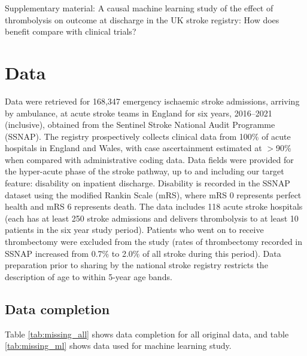 
{\huge Supplementary material: A causal machine learning study of the effect of thrombolysis on outcome at discharge in the UK stroke registry: How does benefit compare with clinical trials?}


\section{Data}



Data were retrieved for 168,347 emergency ischaemic stroke admissions, arriving by ambulance, at acute stroke teams in England for six years, 2016–2021 (inclusive), obtained from the Sentinel Stroke National Audit Programme (SSNAP). The registry prospectively collects clinical data from 100\% of acute hospitals in England and Wales, with case ascertainment estimated at $>$90\% when compared with administrative coding data. Data fields were provided for the hyper-acute phase of the stroke pathway, up to and including our target feature: disability on inpatient discharge. Disability is recorded in the SSNAP dataset using the modified Rankin Scale (mRS), where mRS 0 represents perfect health and mRS 6 represents death. The data includes 118 acute stroke hospitals (each has at least 250 stroke admissions and delivers thrombolysis to at least 10 patients in the six year study period). Patients who went on to receive thrombectomy were excluded from the study (rates of thrombectomy recorded in SSNAP increased from 0.7\% to 2.0\% of all stroke during this period).  Data preparation prior to sharing by the national stroke registry restricts the description of age to within 5-year age bands.

\subsection{Data completion}

Table \ref{tab:missing_all} shows data completion for all original data, and table \ref{tab:missing_ml} shows data used for machine learning study.

